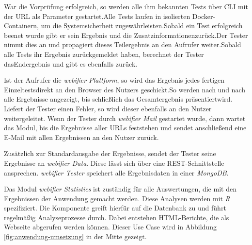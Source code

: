 War die Vorprüfung erfolgreich, so werden alle ihm bekannten Tests über \ac{CLI} mit der \acs{URL} als Parameter gestartet.Alle Tests laufen in isolierten Docker-Containern, um die Systemsicherheit zugewährleisten.Sobald ein Test erfolgreich beenet wurde gibt er sein Ergebnis und die Zusatzinformationenzurück.Der Tester nimmt dies an und propagiert dieses Teilergebnis an den Aufrufer weiter.Sobald alle Tests ihr Ergebnis zurückgemeldet haben, berechnet der Tester dasEndergebnis und gibt es ebenfalls zurück.

Ist der Aufrufer die \textit{webifier Plattform}, so wird das Ergebnis jedes fertigen Einzeltestsdirekt an den Browser des Nutzers geschickt.So werden nach und nach alle Ergebnisse angezeigt, bis schließlich das Gesamtergebnis präsentiertwird.
Liefert der Tester einen Fehler, so wird dieser ebenfalls an den Nutzer weitergeleitet.
Wenn der Tester durch \textit{webifier Mail} gestartet wurde, dann wartet das Modul, bis die
Ergebnisse aller \acsp{URL} feststehen und sendet anschließend eine E-Mail mit allen Ergebnissen an
den Nutzer zurück.

Zusätzlich zur Standardausgabe der Ergebnisse, sendet der
Tester seine Ergebnisse an \textit{webifier Data}.
Diese lässt sich über eine \ac{REST}-Schnittstelle ansprechen.
\textit{webifier Tester} speichert alle Ergebnisdaten in einer \textit{MongoDB}.

Das Modul \textit{webifier Statistics} ist zuständig für alle Auswertungen, die mit den Ergebnissen
der Anwendung gemacht werden.
Diese Analysen werden mit \textit{R} spezifiziert.
Die Komponente greift hierfür auf die Datenbank zu und führt regelmäßig Analyseprozesse
durch.
Dabei entstehen \ac{HTML}-Berichte, die als Webseite abgerufen werden können.
Dieser Use Case wird in Abbildung \ref{fig:anwendung-umsetzung} in der Mitte gezeigt.

